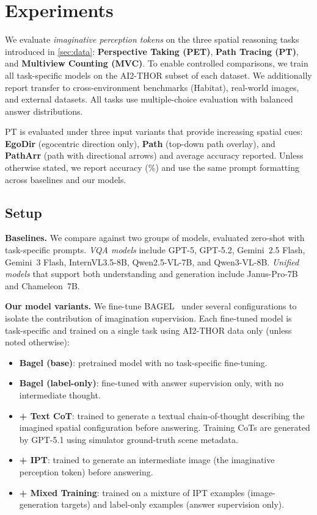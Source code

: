 \section{Experiments}



We evaluate \emph{imaginative perception tokens} on the three spatial reasoning tasks introduced in \cref{sec:data}: \textbf{Perspective Taking (PET)}, \textbf{Path Tracing (PT)}, and \textbf{Multiview Counting (MVC)}. To enable controlled comparisons, we train all task-specific models on the AI2-THOR subset of each dataset. We additionally report transfer to cross-environment benchmarks (Habitat), real-world images, and external datasets. All tasks use multiple-choice evaluation with balanced answer distributions.

PT is evaluated under three input variants that provide increasing spatial cues: \textbf{EgoDir} (egocentric direction only), \textbf{Path} (top-down path overlay), and \textbf{PathArr} (path with directional arrows) and average accuracy reported. Unless otherwise stated, we report accuracy (\%) and use the same prompt formatting across baselines and our models.

\subsection{Setup}

\noindent\textbf{Baselines.}
We compare against two groups of models, evaluated zero-shot with task-specific prompts.
\emph{VQA models} include GPT-5, GPT-5.2, Gemini~2.5 Flash, Gemini~3 Flash, InternVL3.5-8B, Qwen2.5-VL-7B, and Qwen3-VL-8B.
\emph{Unified models} that support both understanding and generation include Janus-Pro-7B and Chameleon~7B.

\noindent\textbf{Our model variants.}
We fine-tune BAGEL~\cite{deng2025bagel} under several configurations to isolate the contribution of imagination supervision. Each fine-tuned model is task-specific and trained on a single task using AI2-THOR data only (unless noted otherwise):
\begin{itemize}
    \item \textbf{Bagel (base)}: pretrained model with no task-specific fine-tuning.
    \item \textbf{Bagel (label-only)}: fine-tuned with answer supervision only, with no intermediate thought.
    \item \textbf{+ Text CoT}: trained to generate a textual chain-of-thought describing the imagined spatial configuration before answering. Training CoTs are generated by GPT-5.1 using simulator ground-truth scene metadata.
    \item \textbf{+ IPT}: trained to generate an intermediate image (the imaginative perception token) before answering.
    \item \textbf{+ Mixed Training}: trained on a mixture of IPT examples (image-generation targets) and label-only examples (answer supervision only).
\end{itemize}

